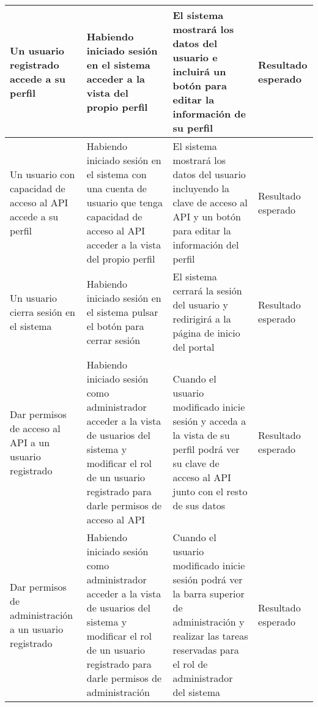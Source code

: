 \begin{landscape}
\begin{longtable}[c]{|p{50mm}|p{50mm}|p{50mm}|p{50mm}|}
	\hline
	Un usuario registrado accede a su perfil & Habiendo iniciado sesión en el sistema acceder a la vista del propio perfil & El sistema mostrará los datos del usuario e incluirá un botón para editar la información de su perfil & Resultado esperado\\
	\hline
	Un usuario con capacidad de acceso al API accede a su perfil & Habiendo iniciado sesión en el sistema con una cuenta de usuario que tenga capacidad de acceso al API acceder a la vista del propio perfil & El sistema mostrará los datos del usuario incluyendo la clave de acceso al API y un botón para editar la información del perfil & Resultado esperado\\
	\hline
	Un usuario cierra sesión en el sistema & Habiendo iniciado sesión en el sistema pulsar el botón para cerrar sesión & El sistema cerrará la sesión del usuario y redirigirá a la página de inicio del portal & Resultado esperado\\
	\hline
	Dar permisos de acceso al API a un usuario registrado & Habiendo iniciado sesión como administrador acceder a la vista de usuarios del sistema y modificar el rol de un usuario registrado para darle permisos de acceso al API & Cuando el usuario modificado inicie sesión y acceda a la vista de su perfil podrá ver su clave de acceso al API junto con el resto de sus datos & Resultado esperado\\
	\hline
	Dar permisos de administración a un usuario registrado & Habiendo iniciado sesión como administrador acceder a la vista de usuarios del sistema y modificar el rol de un usuario registrado para darle permisos de administración & Cuando el usuario modificado inicie sesión podrá ver la barra superior de administración y realizar las tareas reservadas para el rol de administrador del sistema & Resultado esperado\\
	\hline
	\hline
	
	 \end{longtable}
\end{landscape}

